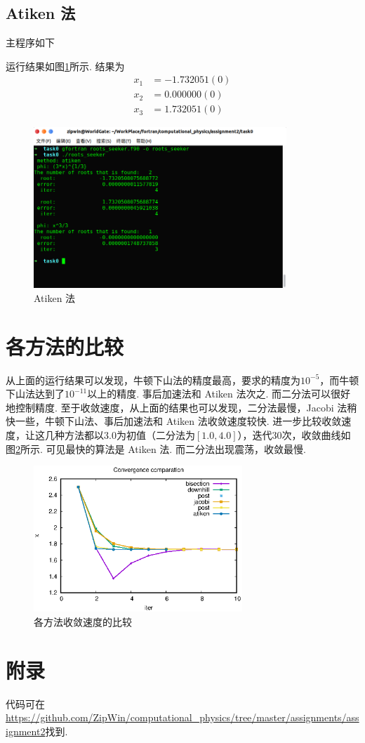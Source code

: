 \documentclass{article}
\begin{document}
	\subsection{Atiken 法}
	主程序如下
	
	运行结果如图\ref{fig:rtr_atiken}所示. 结果为
	\[
	\begin{split}
	x_1&=-1.732051(0) \\
	x_2&=0.000000(0) \\
	x_3&=1.732051(0)
	\end{split}
	\]
	\begin{figure}[h!tb]
		\centering
		\includegraphics[width=0.85\textwidth]{./utils/rtr_atiken.png}
		\caption{ Atiken 法\label{fig:rtr_atiken}}
	\end{figure}
	
	\section{各方法的比较}
	从上面的运行结果可以发现，牛顿下山法的精度最高，要求的精度为$10^{-5}$，而牛顿下山法达到了$10^{-11}$以上的精度. 事后加速法和 Atiken 法次之. 而二分法可以很好地控制精度. 至于收敛速度，从上面的结果也可以发现，二分法最慢，Jacobi 法稍快一些，牛顿下山法、事后加速法和 Atiken 法收敛速度较快. 进一步比较收敛速度，让这几种方法都以$3.0$为初值（二分法为$[1.0, 4.0]$），迭代30次，收敛曲线如图\ref{fig:compare}所示. 可见最快的算法是 Atiken 法. 而二分法出现震荡，收敛最慢.
	\begin{figure}[h!tb]
		\centering
		\includegraphics[width=0.7\textwidth]{./utils/compare.eps}
		\caption{ 各方法收敛速度的比较\label{fig:compare}}
	\end{figure}
	
	\newpage
	\section*{附录}
	代码可在\url{https://github.com/ZipWin/computational_physics/tree/master/assignments/assignment2}找到.
	
	
	
\end{document}
